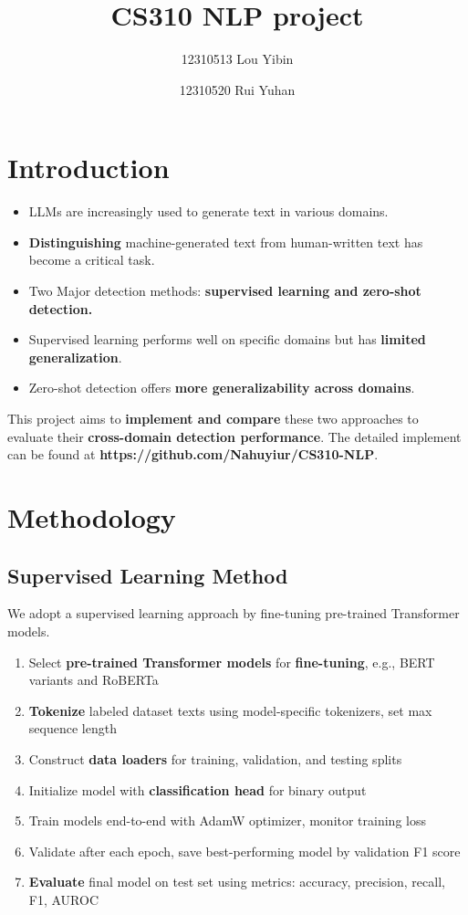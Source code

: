 \documentclass[lettersize,journal]{IEEEtran}
\begin{document}
\title{CS310 NLP project}
\author{12310513 Lou Yibin \and 12310520 Rui Yuhan}

\maketitle


\section{Introduction}
\begin{itemize}
  \item LLMs are increasingly used to generate text in various domains.
  \item \textbf{Distinguishing} machine-generated text from human-written text has become a critical task.
  \item Two Major detection methods: \textbf{supervised learning and zero-shot detection.}
  \item Supervised learning performs well on specific domains but has \textbf{limited generalization}.
  \item Zero-shot detection offers \textbf{more generalizability across domains}.
\end{itemize}

This project aims to \textbf{implement and compare} these two approaches to evaluate their \textbf{cross-domain detection performance}. The detailed implement can be found at \textbf{https://github.com/Nahuyiur/CS310-NLP}.

\section{Methodology}
\subsection{Supervised Learning Method}
We adopt a supervised learning approach by fine-tuning pre-trained Transformer models.

\begin{enumerate}
  \item Select \textbf{pre-trained Transformer models} for \textbf{fine-tuning}, e.g., BERT variants and RoBERTa
  \item \textbf{Tokenize} labeled dataset texts using model-specific tokenizers, set max sequence length
  \item Construct \textbf{data loaders} for training, validation, and testing splits
  \item Initialize model with \textbf{classification head} for binary output
  \item Train models end-to-end with AdamW optimizer, monitor training loss
  \item Validate after each epoch, save best-performing model by validation F1 score
  \item \textbf{Evaluate} final model on test set using metrics: accuracy, precision, recall, F1, AUROC
\end{enumerate}
\vspace{0.3cm}
\end{document}

